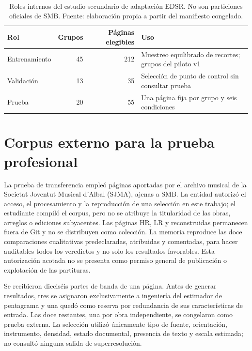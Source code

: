 \begin{table}[htbp]
  \centering
  \small
  \caption{Roles internos del estudio secundario de adaptación EDSR. No son particiones oficiales
  de SMB. Fuente: elaboración propia a partir del manifiesto congelado.}
  \label{tab:adaptation-split}
  \begin{tabular}{lrrp{}}
    \toprule
    Rol & Grupos & Páginas elegibles & Uso \\
    \midrule
    Entrenamiento & 45 & 212 & Muestreo equilibrado de recortes; grupos del piloto v1 \\
    Validación & 13 & 35 & Selección de punto de control sin consultar prueba \\
    Prueba & 20 & 55 & Una página fija por grupo y seis condiciones \\
    \bottomrule
  \end{tabular}
\end{table}

\section{Corpus externo para la prueba profesional}
La prueba de transferencia empleó páginas aportadas por el archivo musical de la Societat Joventut
Musical d'Albal (SJMA), ajenas a SMB. La entidad autorizó el acceso, el procesamiento y la
reproducción de una selección en este trabajo; el estudiante compiló el corpus, pero no se atribuye
la titularidad de las obras, arreglos o ediciones subyacentes. Las páginas HR, LR y reconstruidas
permanecen fuera de Git y no se distribuyen como colección. La memoria reproduce las doce
comparaciones cualitativas predeclaradas, atribuidas y comentadas, para hacer auditables todos los
veredictos y no solo los resultados favorables. Esta autorización acotada no se presenta como permiso
general de publicación o explotación de las partituras.

Se recibieron dieciséis partes de banda de una página. Antes de generar resultados, tres se
asignaron exclusivamente a ingeniería del estimador de pentagrama y una quedó como reserva por
redundancia de sus características de entrada. Las doce restantes, una por obra independiente, se
congelaron como prueba externa. La selección utilizó únicamente tipo de fuente, orientación,
instrumento, densidad, estado documental, presencia de texto y escala estimada; no consultó ninguna
salida de superresolución.


